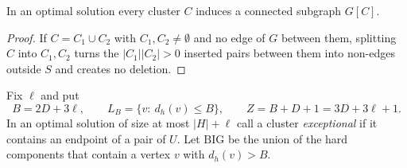 \begin{lemma}\label{lem:conn}
In an optimal solution every cluster $C$ induces a connected subgraph $G[C]$.
\end{lemma}
\begin{proof}
If $C=C_1\cup C_2$ with $C_1,C_2\neq\emptyset$ and no edge of $G$ between them, splitting $C$ into $C_1,C_2$ turns the $|C_1||C_2|>0$ inserted pairs between them into non-edges outside $S$ and creates no deletion.
\end{proof}

Fix $\ell$ and put
\[
B=2D+3\ell,\qquad L_B=\{v:\ d_h(v)\le B\},\qquad Z=B+D+1=3D+3\ell+1.
\]
In an optimal solution of size at most $|H|+\ell$ call a cluster \emph{exceptional} if it contains an endpoint of a pair of $U$. Let $\mathrm{BIG}$ be the union of the hard components that contain a vertex $v$ with $d_h(v)>B$.

